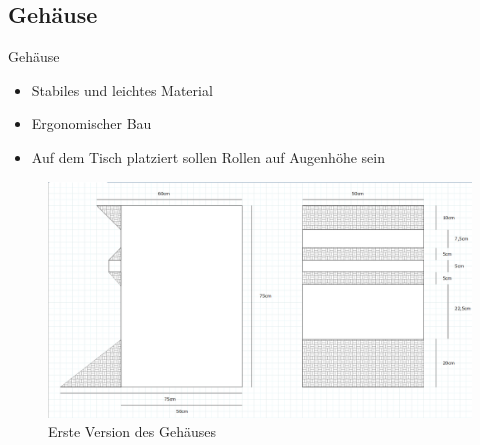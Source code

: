 \documentclass[mathserif,9pt]{beamer}
\begin{document}
    \subsection{Gehäuse}
    \begin{frame}{Gehäuse}
        \begin{block}{}
            \begin{itemize}
                \item Stabiles und leichtes Material
                \item Ergonomischer Bau
                \item Auf dem Tisch platziert sollen Rollen auf Augenhöhe sein
            \end{itemize}
            \begin{figure}
                \centering
                \includegraphics[height=0.4\paperheight]{img/gehause.png}
                \caption{Erste Version des Geh\"auses}
                \label{fig:gehausev1}
            \end{figure}
        \end{block}
    \end{frame}
    
\end{document}
